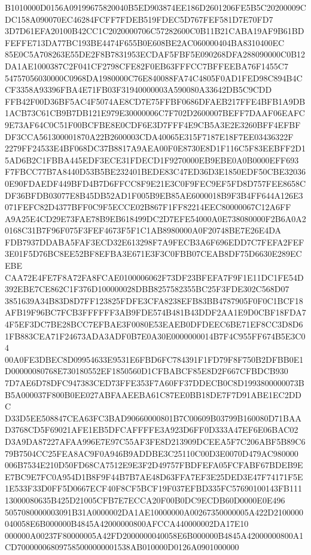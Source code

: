 \documentclass[UTF8,fontset=fandol,zihao=-4,a4paper]{ctexart}
\begin{document}
{{B1010000D0156A09199675820040B5ED903874EE186D2601206FE5B5C20200009CDC158A090070EC46284FCFF7FDEB519FDEC5D767FEF581D7E70FD7
3D7D61EFA20100B42CC1C2020000706C57282600C0B11B21CABA19AF9B61BDFEFFE713DA77BC193BE4474F655B0E608BE2AC060000404BA8310400EC
85E0C5A708263E55DE2F8B7831953ECDAF5FBF5E090268DFA288090000C0B12DA1AE1000387C2F041CF2798CFE82F0EB63FFFCC7BFFEEBA76F1455C7
54757056030000C0968DA1980000C76E840088FA74C4805F0AD1FED98C894B4CCF3358A93396FBA4E71FB03F31940000003A590080A33642DB5C9CDD
FFB42F00D36BF5AC4F5074AE8CD7E75FFBF0686DFAEB217FFE4BFB1A9DB1ACB73C61CB9B7DB121E979E30000006C7F702D2600007BEFF7DAAF06EAFC
9E73AF64C0C51F00BCFBE8E0CDF6E3D7FFF4E9CB5A3E2E3260BFF4EFBFDF3CCA561300001870A22B2600003CDA40065E315F7187E18F7EE03436322F
2279FF24533E4BF068DC37B8817A9AEA00F0E8730E8D1F116C5F83EEBFF2D15AD6B2C1FBBA445EDF3ECE31FDECD1F9270000EB9EBE0A0B0000EFF693
F7FBCC77B7A8440D53B5BE232401BEDE83C47ED36D3E1850EDF50CBE320360E90FDAEDF449BFD4B7D6FFCC8F9E21E3C0F9FEC9EF5FD8D757FEE8658C
DF36BFDB03077E8B45DB52AD1F005B9EB85AE6000018B9F3B4FF644A126E3071FEFC82D4377BFF0C9F5ECCE02B867F1FF82214EEC80000067C12A6FF
A9A25E4CD29E73FAE78B9EB618499DC2D7EFE54000A0E738080000F2B6A0A20168C31B7F96F075F3FEF4673F5F1C1AB8980000A0F20748BE7E26E4DA
FDB7937DDABA5FAF3ECD32E613298F7A9FECB3A6F696EDD7C7FEFA2FEF3E01F5D76BC8EE52BF8EFBA3E671E3F3C0FBB07CEAB8DF75D6630E289ECEBE
CAA72E4FE7F8A72FA8FCAE0100006062F73DF23BFEFA7F9F1E11DC1FE54D392EBE7CE862C1F376D100000028DBB8257582355BC25F3FDE302C568D07
3851639A34B83D8D7FF123825FDFE3CFA8238EFB83BB4787905F0F0C1BCF18AFB19F96BC7FCB3FFFFFF3AB9FDE574B481B43DDF2AA1E9D0CBF18FDA7
4F5EF3DC7BE28BCC7EFBAE3F0080E53EAEB0DFDEEC6BE71EF8CC3D8D61FB883CEA71F24673ADA3ADF0B7E0A30E0000000014B7F4C955FF674B5E3C04
00A0FE3DBEC8D09954633E9531E6FBD6FC784391F1FD79F8F750B2DFBB0E1D00000080768E730180552EF1850560D1CFBABCF85E8D2F667CFBDCB930
7D7AE6D78DFC947383CED73FFE353F7A60FF37DDECB0C8D1993800000073BB5A000037F800B0EE027ABFAAEEBA61C87EE0BB18DE7F7D91ABE1EC2DDC
D33D5EE508847CEA63FC3BAD90660000801B7C00609B03799B160080D71BAAD3768CD5F69021AFE1EB5DFCAFFFFE3A923D6FF0D333A47EF6E06BAC02
D3A9DA87227AFAA996E7E97C55AF3FE8D213909DCEEA5F7C206ABF5B89C679B7504CC25FEA8AC9F0A946B9ADDBE3C25110C00D3E0070D479AC980000
006B7534E210D50FD68CA7512E9E3F2D49757FBDFEFA05FCFABF67BDEB9EE7BC9E7FC0A954D1B8F9F44B7B7AE48D63FFA7EF3E25DED3E47F74171F5E
1E533F33D0FF5D0667ECF40F8CF5BCF19F037EFBD335FC57690100143FB11113000080635B425D21005CFB7E7ECCA20F00B0DC9ECDB60D0000E0E496
5057080000003091B31A0000002DA1AE10000000A00267350000005A422D2100000040058E6B000000B4845A42000000800AFCCA440000002DA17E10
000000A00237F80000005A42FD2000000040058E6B000000B4845A42000000800A1CD700000068097585000000001538AB010000D0126A0901000000
}}
\end{document}
